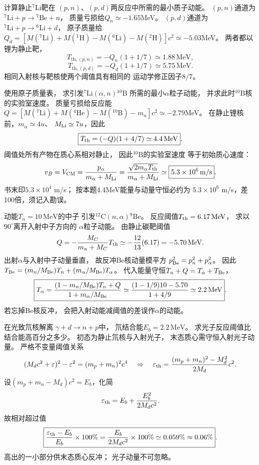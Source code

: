 计算静止$^{7}\mathrm{Li}$靶在
$(p,n)$、$(p,d)$两反应中所需的最小质子动能。
\exsolution
$(p,n)$通道为
$^{7}\mathrm{Li}+p\to{}^{7}\mathrm{Be}+n$，
质量亏损给$Q_n\simeq-1.65$MeV。
$(p,d)$通道为
$^{7}\mathrm{Li}+p\to{}^{6}\mathrm{Li}+d$，
原子质量给
$Q_d=[M(^{7}\mathrm{Li})+M(^1\mathrm H)
 -M(^{6}\mathrm{Li})-M(^2\mathrm H)]c^2
 \simeq-5.03$MeV。
两者都以锂为静止靶，
\[
 \boxed{T_{\mathrm{th},(p,n)}
 =-Q_n(1+1/7)\simeq1.88\,\mathrm{MeV}},
\]
\[
 \boxed{T_{\mathrm{th},(p,d)}
 =-Q_d(1+1/7)\simeq5.75\,\mathrm{MeV}}.
\]
\excheck 相同入射核与靶核使两个阈值具有相同的
运动学修正因子$8/7$。

使用原子质量表，
求引发$^{7}\mathrm{Li}(\alpha,n){}^{10}\mathrm B$
所需的最小$\alpha$粒子动能，
并求此时$^{10}\mathrm B$核的实验室速度。
\exsolution
质量亏损给反应能
$Q=[M(^{7}\mathrm{Li})+M(^{4}\mathrm{He})
-M(^{10}\mathrm B)-m_n]c^2\simeq-2.79$MeV。
在静止锂核前，$m_\alpha\simeq4u$、
$M_{\rm Li}\simeq7u$，因此
\[
 \boxed{T_{\rm th}=(-Q)(1+4/7)
 \simeq4.4\,\mathrm{MeV}}.
\]
阈值处所有产物在质心系相对静止，
因此$^{10}\mathrm B$的实验室速度
等于初始质心速度：
\[
 v_B=V_{\rm CM}
 =\frac{p_\alpha}{m_\alpha+M_{\rm Li}}
 =\frac{\sqrt{2m_\alpha T_{\rm th}}}{m_\alpha+M_{\rm Li}}
 \simeq\boxed{5.3\times10^6\,\mathrm{m/s}}.
\]
\excheck 书末印$5.3\times10^4$ m/s；
按本题$4.4$MeV能量与动量守恒必约为
$5.3\times10^6$ m/s，差100倍，须记入勘误。

动能$T_n=10\,\mathrm{MeV}$的中子
引发$^{12}\mathrm C(n,\alpha){}^{9}\mathrm{Be}$。
反应阈值$T_{\rm th}=6.17\,\mathrm{MeV}$，
求以$90^\circ$离开入射中子方向的
$\alpha$粒子动能。
\exsolution
由静止碳靶阈值
\[
 Q=-\frac{M_C}{m_n+M_C}T_{\rm th}
 \simeq-\frac{12}{13}(6.17)
 =-5.70\,\mathrm{MeV}.
\]
出射$\alpha$与入射中子动量垂直，
故反冲Be核动量模平方
$p_{\rm Be}^2=p_n^2+p_\alpha^2$。
因此
$T_{\rm Be}=(m_n/M_{\rm Be})T_n+
(m_\alpha/M_{\rm Be})T_\alpha$。
代入能量守恒$T_n+Q=T_\alpha+T_{\rm Be}$，
\[
 \boxed{T_\alpha=
 \frac{(1-m_n/M_{\rm Be})T_n+Q}
 {1+m_\alpha/M_{\rm Be}}
 \simeq\frac{(1-1/9)10-5.70}{1+4/9}
 \simeq2.2\,\mathrm{MeV}}.
\]
\excheck 若忘掉Be核反冲，
会把入射动能减阈值的差误作$\alpha$的动能。

在光致氘核解离
$\gamma+d\to n+p$中，
氘结合能$E_b=2.2\,\mathrm{MeV}$。
求光子反应阈值比结合能高百分之多少。
\exsolution
初态为静止氘核与入射光子，
末态质心需守恒入射光子动量。
严格不变量阈值关系
\[
 (M_dc^2+\varepsilon)^2-\varepsilon^2
 =(m_p+m_n)^2c^4
 \quad\Rightarrow\quad
 \varepsilon_{\rm th}
 =\frac{(m_p+m_n)^2-M_d^2}{2M_d}c^2.
\]
设$(m_p+m_n-M_d)c^2=E_b$，化简
\[
 \varepsilon_{\rm th}
 =E_b+\frac{E_b^2}{2M_dc^2}.
\]
故相对超过值
\[
 \boxed{\frac{\varepsilon_{\rm th}-E_b}{E_b}\times100\%
 =\frac{E_b}{2M_dc^2}\times100\%
 \simeq0.059\%\approx0.06\%}.
\]
\excheck 高出的一小部分供末态质心反冲；
光子动量不可忽略。

